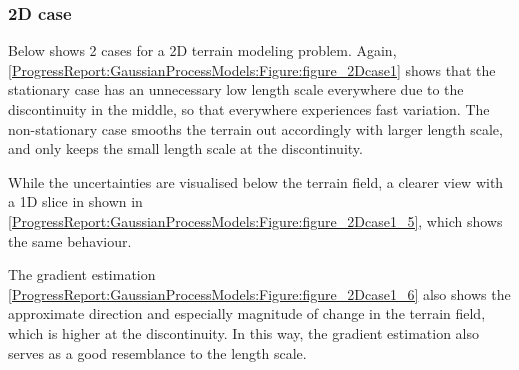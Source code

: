 				\FloatBarrier
				
			\subsubsection{2D case}			
			
				Below shows 2 cases for a 2D terrain modeling problem. Again, \cref{ProgressReport:GaussianProcessModels:Figure:figure_2Dcase1} shows that the stationary case has an unnecessary low length scale everywhere due to the discontinuity in the middle, so that everywhere experiences fast variation. The non-stationary case smooths the terrain out accordingly with larger length scale, and only keeps the small length scale at the discontinuity.
				
				While the uncertainties are visualised below the terrain field, a clearer view with a 1D slice in shown in \cref{ProgressReport:GaussianProcessModels:Figure:figure_2Dcase1_5}, which shows the same behaviour.
				
				The gradient estimation \cref{ProgressReport:GaussianProcessModels:Figure:figure_2Dcase1_6} also shows the approximate direction and especially magnitude of change in the terrain field, which is higher at the discontinuity. In this way, the gradient estimation also serves as a good resemblance to the length scale.
				
